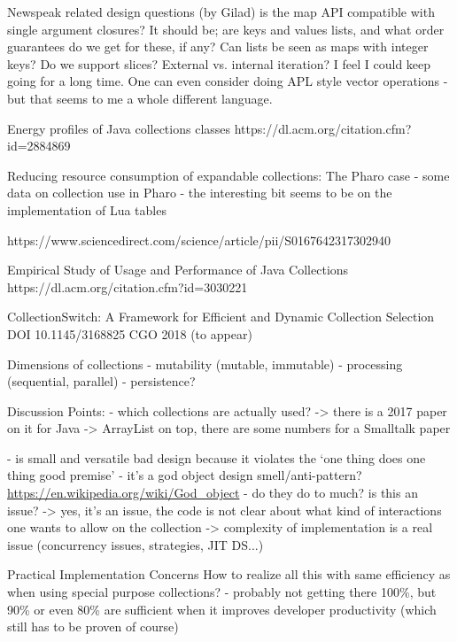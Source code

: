 \documentclass[sigconf, 10pt, review]{acmart}
\begin{document}
\begin{note}
  
Newspeak related design questions (by Gilad)
is the map API compatible with single argument closures? It should be; are keys and values lists, and what order guarantees do we get for these, if any? Can lists be seen as maps with integer keys? Do we support slices? External vs. internal iteration? I feel I could keep going for a long time. One can even consider doing APL style vector operations - but that seems to me a whole different language.


Energy profiles of Java collections classes
https://dl.acm.org/citation.cfm?id=2884869

Reducing resource consumption of expandable collections: The Pharo case
- some data on collection use in Pharo
- the interesting bit seems to be on the implementation of Lua tables

https://www.sciencedirect.com/science/article/pii/S0167642317302940

Empirical Study of Usage and Performance of Java Collections
https://dl.acm.org/citation.cfm?id=3030221


CollectionSwitch: A Framework for Efficient and Dynamic Collection Selection
DOI 10.1145/3168825
CGO 2018 (to appear)






Dimensions of collections
- mutability (mutable, immutable)
- processing (sequential, parallel)
- persistence?

Discussion Points:
- which collections are actually used?
 -> there is a 2017 paper on it for Java
 -> ArrayList on top, there are some numbers for a Smalltalk paper
 

 - is small and versatile bad design because it violates the `one thing does one thing good premise'
   - it's a god object design smell/anti-pattern?
    \url{https://en.wikipedia.org/wiki/God_object}
    - do they do to much? is this an issue?
     -> yes, it's an issue, the code is not clear about what kind of 
        interactions one wants to allow on the collection
     -> complexity of implementation is a real issue (concurrency issues,
        strategies, JIT DS...)

Practical Implementation Concerns
 How to realize all this with same efficiency as when using special purpose
 collections?
 - probably not getting there 100\%, but 90\% or even 80\% are sufficient
   when it improves developer productivity (which still has to be proven of course)
  

\end{note}
\end{document}
